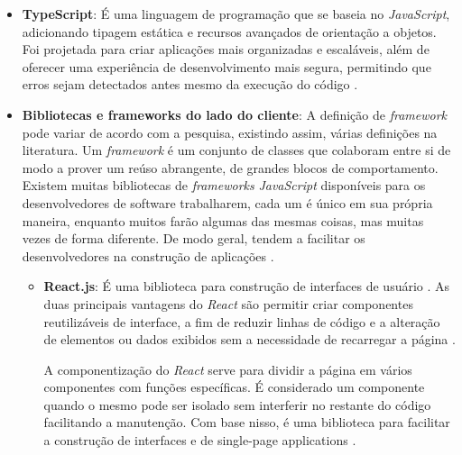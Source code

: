 \begin{itemize}
    \item \textbf{TypeScript}: É uma linguagem de programação que se baseia no \textit{JavaScript}, adicionando tipagem estática e recursos avançados de orientação a objetos. Foi projetada para criar aplicações mais organizadas e escaláveis, além de oferecer uma experiência de desenvolvimento mais segura, permitindo que erros sejam detectados antes mesmo da execução do código \cite{microsoft2025}.
    \item \textbf{Bibliotecas e frameworks do lado do cliente}: A definição de \textit{framework} pode variar de acordo com a pesquisa, existindo assim, várias definições na literatura. Um \textit{framework} é um conjunto de classes que colaboram entre si de modo a prover um reúso abrangente, de grandes blocos de comportamento. Existem muitas bibliotecas de \textit{frameworks} \textit{JavaScript} disponíveis para os desenvolvedores de software trabalharem, cada um é único em sua própria maneira, enquanto muitos farão algumas das mesmas coisas, mas muitas vezes de forma diferente. De modo geral, tendem a facilitar os desenvolvedores na construção de aplicações \cite{silva2022comparaccao}.
    \begin{itemize}
        \item \textbf{React.js}: É uma biblioteca para construção de interfaces de usuário \cite{react2025}. As duas principais vantagens do \textit{React} são permitir criar componentes reutilizáveis de interface, a fim de reduzir linhas de código e a alteração de elementos ou dados exibidos sem a necessidade de recarregar a página \cite{LorenaUFOP2021}.
        
        A componentização do \textit{React} serve para dividir a página em vários componentes com funções específicas. É considerado um componente quando o mesmo pode ser isolado sem interferir no restante do código facilitando a manutenção. Com base nisso, é uma biblioteca para facilitar a construção de interfaces e de single-page applications \cite{LorenaUFOP2021}.
        

\end{itemize}
\end{itemize}
